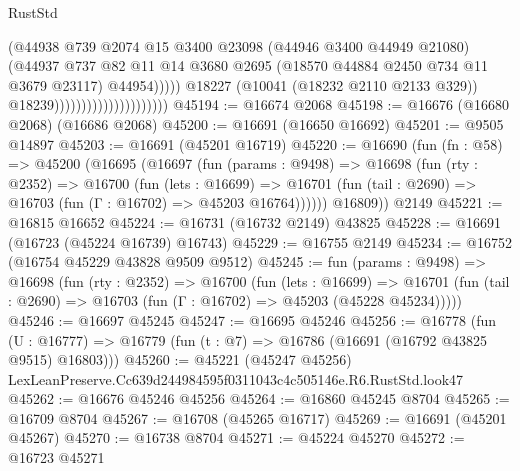 \begin{lexlean}{RustStd}
\begin{coremodule}
                                                    (@44938
                                                      @739
                                                      @2074
                                                      @15
                                                      @3400
                                                      @23098
                                                      (@44946 @3400 @44949 @21080)
                                                      (@44937
                                                        @737
                                                        @82
                                                        @11
                                                        @14
                                                        @3680
                                                        @2695
                                                        (@18570 @44884 @2450 @734 @11 @3679 @23117)
                                                        @44954)))))
                                              @18227
                                              (@10041 (@18232 @2110 @2133 @329))
                                              @18239)))))))))))))))))))))
@45194 := @16674 @2068
@45198 := @16676 (@16680 @2068) (@16686 @2068)
@45200 := @16691 (@16650 @16692)
@45201 := @9505 @14897
@45203 := @16691 (@45201 @16719)
@45220 := @16690
    (fun (fn : @58) =>
    @45200
      (@16695
        (@16697
          (fun (params : @9498) =>
          @16698
            (fun (rty : @2352) =>
            @16700
              (fun (lets : @16699) =>
              @16701 (fun (tail : @2690) => @16703 (fun (Γ : @16702) => @45203 @16764))))))
        @16809))
    @2149
@45221 := @16815 @16652
@45224 := @16731 (@16732 @2149) @43825
@45228 := @16691 (@16723 (@45224 @16739) @16743)
@45229 := @16755 @2149
@45234 := @16752 (@16754 @45229 @43828 @9509 @9512)
@45245 := fun (params : @9498) =>
  @16698
    (fun (rty : @2352) =>
    @16700
      (fun (lets : @16699) =>
      @16701 (fun (tail : @2690) => @16703 (fun (Γ : @16702) => @45203 (@45228 @45234)))))
@45246 := @16697 @45245
@45247 := @16695 @45246
@45256 := @16778
    (fun (U : @16777) => @16779 (fun (t : @7) => @16786 (@16691 (@16792 @43825 @9515) @16803)))
@45260 := @45221 (@45247 @45256) LexLeanPreserve.Cc639d244984595f0311043c4c505146e.R6.RustStd.look47
@45262 := @16676 @45246 @45256
@45264 := @16860 @45245 @8704
@45265 := @16709 @8704
@45267 := @16708 (@45265 @16717)
@45269 := @16691 (@45201 @45267)
@45270 := @16738 @8704
@45271 := @45224 @45270
@45272 := @16723 @45271

\end{coremodule}
\end{lexlean}
